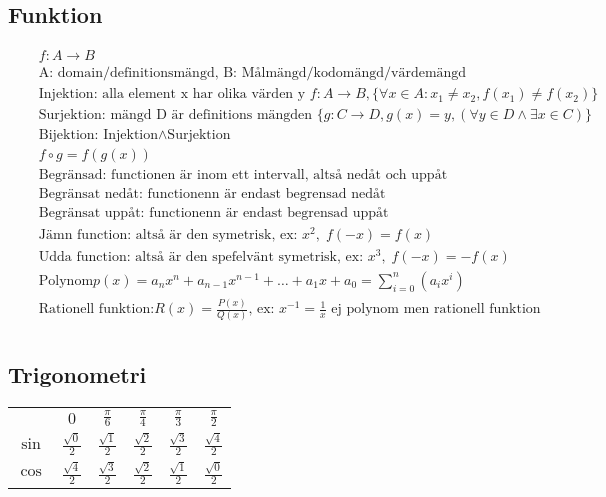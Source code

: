 \subsection{Funktion}
\begin{align*}
  &\quad  f: A \to B \\
  &\quad  \text{A: domain/definitionsmängd, B: Målmängd/kodomängd/värdemängd} \\
  &\quad  \text{Injektion: alla element x har olika värden y } f: A \to B,
  \{{\forall x \in A: x_1 \neq x_2, f(x_1) \neq f(x_2)}\} \\
  &\quad  \text{Surjektion: mängd D är definitions mängden } \{g: C \to D, g(x)=y,
  (\forall y \in D \land \exists x \in C)\} \\
  &\quad  \text{Bijektion: } \text{Injektion} \land \text{Surjektion}  \\
  &\quad  f \circ g = f(g(x)) \\
  &\quad  \text{Begränsad: functionen är inom ett intervall, altså nedåt och uppåt} \\
  &\quad  \text{Begränsat nedåt: functionenn är endast begrensad nedåt} \\
  &\quad  \text{Begränsat uppåt: functionenn är endast begrensad uppåt} \\
  &\quad  \text{Jämn function: altså är den symetrisk, ex: } x^2, \; f(-x)=f(x) \\
  &\quad  \text{Udda function: altså är den spefelvänt symetrisk, ex: } x^3, \; f(-x)=-f(x) \\
  &\quad  \text{Polynom} p(x)=a_nx^n +a_{n-1}x^{n-1}+ \ldots +a_1x +a_0
  = \displaystyle\sum _ { i=0 } ^ { n } (a_i x^{i}) \\
  &\quad  \text{Rationell funktion:} R(x)=\frac{P(x)}{Q(x)} \text{, ex: } x^{-1}
  =\frac{1}{x} \text{ ej polynom men rationell funktion} \\
\end{align*}


\newpage

\subsection{Trigonometri}
\begin{center}
\begin{tabular}{ |c|c|c|c|c|c| } 
 \hline
        & $0$                  & $\frac{\pi}{6}$      & $\frac{\pi}{4}$      & $\frac{\pi}{3}$    & $\frac{\pi}{2}$ \\ 
 $\sin$ & $\frac{\sqrt{0}}{2}$ & $\frac{\sqrt{1}}{2}$ & $\frac{\sqrt{2}}{2}$ & $\frac{\sqrt{3}}{2}$ & $\frac{\sqrt{4}}{2}$ \\ 
 $\cos$ & $\frac{\sqrt{4}}{2}$ & $\frac{\sqrt{3}}{2}$ & $\frac{\sqrt{2}}{2}$ & $\frac{\sqrt{1}}{2}$ & $\frac{\sqrt{0}}{2}$ \\  
 \hline
\end{tabular}
\end{center}


